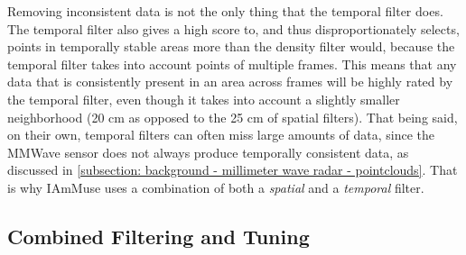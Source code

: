 Removing inconsistent data is not the only thing that the temporal filter does.
The temporal filter also gives a high score to, and thus disproportionately selects, points in temporally stable areas more than the density filter would, because the temporal filter takes into account points of multiple frames.
This means that any data that is consistently present in an area across frames will be highly rated by the temporal filter, even though it takes into account a slightly smaller neighborhood (20 cm as opposed to the 25 cm of spatial filters).
That being said, on their own, temporal filters can often miss large amounts of data, since the MMWave sensor does not always produce temporally consistent data, as discussed in \cref{subsection: background - millimeter wave radar - pointclouds}.
That is why IAmMuse uses a combination of both a \textit{spatial} and a \textit{temporal} filter.


% 


\subsection{Combined Filtering and Tuning}
\label{sub-section: tracking method - data filtering - combined filtering and tuning}

